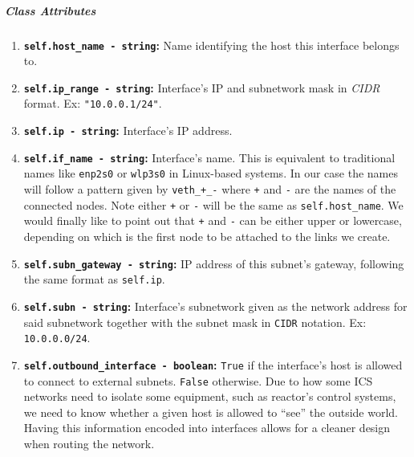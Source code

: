         \subparagraph{Class Attributes}
            \begin{enumerate}
                \item \textbf{\texttt{self.host\_name - string}:} Name identifying the host this interface belongs to.
                \item \textbf{\texttt{self.ip\_range - string}:} Interface's IP and subnetwork mask in \textit{CIDR} \cite{bib:cidr-notation} format. Ex: \texttt{"10.0.0.1/24"}.
                \item \textbf{\texttt{self.ip - string}:} Interface's IP address.
                \item \textbf{\texttt{self.if\_name - string}:} Interface's name. This is equivalent to traditional names like \texttt{enp2s0} or \texttt{wlp3s0} in Linux-based systems. In our case the names will follow a pattern given by \texttt{veth\_+\_-} where \texttt{+} and \texttt{-} are the names of the connected nodes. Note either \texttt{+} or \texttt{-} will be the same as \texttt{self.host\_name}. We would finally like to point out that \texttt{+} and \texttt{-} can be either upper or lowercase, depending on which is the first node to be attached to the links we create.
                \item \textbf{\texttt{self.subn\_gateway - string}:} IP address of this subnet's gateway, following the same format as \texttt{self.ip}.
                \item \textbf{\texttt{self.subn - string}:} Interface's subnetwork given as the network address for said subnetwork together with the subnet mask in \texttt{CIDR} notation. Ex: \texttt{10.0.0.0/24}.
                \item \textbf{\texttt{self.outbound\_interface - boolean}:} \texttt{True} if the interface's host is allowed to connect to external subnets. \texttt{False} otherwise. Due to how some ICS networks need to isolate some equipment, such as reactor's control systems, we need to know whether a given host is allowed to ``see'' the outside world. Having this information encoded into interfaces allows for a cleaner design when routing the network.
            \end{enumerate}


